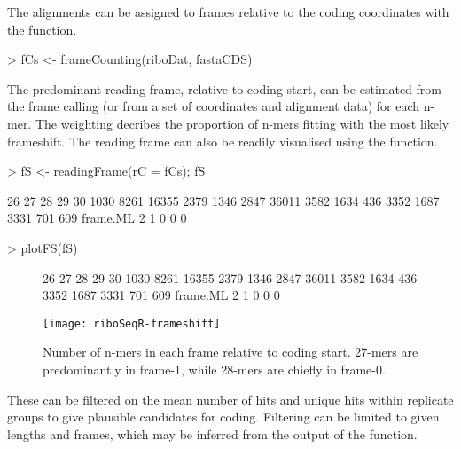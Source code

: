 \documentclass[a4paper]{article}
\begin{document}
The alignments can be assigned to frames relative to the coding coordinates with the  function.

\begin{Schunk}
\begin{Sinput}
> fCs <- frameCounting(riboDat, fastaCDS)
\end{Sinput}
\end{Schunk}

The predominant reading frame, relative to coding start, can be estimated from the frame calling (or from a set of coordinates and alignment data) for each n-mer. The weighting decribes the proportion of n-mers fitting with the most likely frameshift. The reading frame can also be readily visualised using the  function.

\begin{Schunk}
\begin{Sinput}
> fS <- readingFrame(rC = fCs); fS
\end{Sinput}
\begin{Soutput}
           26    27    28   29   30
         1030  8261 16355 2379 1346
         2847 36011  3582 1634  436
         3352  1687  3331  701  609
frame.ML    2     1     0    0    0
\end{Soutput}
\begin{Sinput}
> plotFS(fS)
\end{Sinput}
\end{Schunk}

\begin{figure}[!ht]
\begin{center}
\begin{Schunk}
\begin{Soutput}
           26    27    28   29   30
         1030  8261 16355 2379 1346
         2847 36011  3582 1634  436
         3352  1687  3331  701  609
frame.ML    2     1     0    0    0
\end{Soutput}
\end{Schunk}
\texttt{[image: riboSeqR-frameshift]}
\caption{Number of n-mers in each frame relative to coding start. 27-mers are predominantly in frame-1, while 28-mers are chiefly in frame-0.}
\label{fig:frameshift}
\end{center}
\end{figure}


These can be filtered on the mean number of hits and unique hits within replicate groups to give plausible candidates for coding. Filtering can be limited to given lengths and frames, which may be inferred from the output of the  function.
\end{document}
